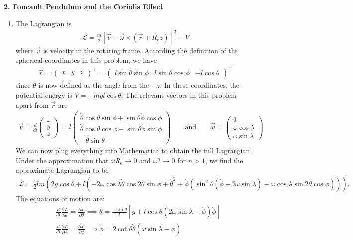 \documentclass{article}
\theoremstyle{definition}
\newcommand{\p}{\partial}
\newcommand{\lag}{\mathcal{L}}
\newcommand{\f}[2]{\frac{#1}{#2}}
\newcommand{\lp}{\left(}
\newcommand{\rp}{\right)}
\newcommand{\lb}{\left[}
\newcommand{\rb}{\right]}
\begin{document}
\noindent \textbf{2. Foucault Pendulum and the Coriolis Effect}

\begin{enumerate}[label=(\alph*)]
	\item The Lagrangian is 
	\begin{align*}
	\lag = \f{m}{2}\lb \vec{v} - \vec{\omega} \times (\vec{r} + R_e \hat{z})  \rb^2 -V
	\end{align*}
	where $\vec{v}$ is velocity in the rotating frame. According the definition of the spherical coordinates in this problem, we have
	\begin{align*}
	\vec{r} = \begin{pmatrix}
	x & y & z
	\end{pmatrix}^\top
	= 
	\begin{pmatrix}
	l\sin\theta\sin\phi & 
	l\sin\theta\cos\phi &
	-l\cos\theta
	\end{pmatrix}^\top
	\end{align*}
	since $\theta$ is now defined as the angle from the $-\hat{z}$. In these coordinates, the potential energy is $V = -mgl\cos\theta$. The relevant vectors in this problem apart from $\vec{r}$ are
	\begin{align*}
	\vec{v} = \f{d}{dt}\begin{pmatrix}
	x\\y\\z
	\end{pmatrix} = 
	l\begin{pmatrix}
	\dot\theta \cos \theta \sin\phi+\sin\theta\dot\phi\cos\phi \\
	\dot\theta \cos\theta \cos\phi-\sin
	\theta \dot\phi \sin\phi\\
	-\dot\theta \sin \theta
	\end{pmatrix}
	\quad \quad \text{and} \quad\quad
	\vec{\omega} = \begin{pmatrix}
	0 \\ \omega \cos\lambda \\ \omega\sin\lambda
	\end{pmatrix}
	\end{align*}
	We can now plug everything into Mathematica to obtain the full Lagrangian. Under the approximation that $\omega R_e \to 0$ and $\omega^n \to 0$ for $n > 1$, we find the approximate Lagrangian to be
	\begin{align*}
	\lag = \frac{1}{2} l m \left(2 g \cos\theta+l \left(-2 \omega  \cos\lambda  \dot\theta
	\cos 2 \theta \sin \phi +\dot\theta^2+\dot\phi \left(\sin^2\theta\left(\dot\phi-2 \omega  \sin \lambda \right)-\omega  \cos \lambda  \sin 2\theta  \cos \phi\right)\right)\right).
	\end{align*}
	The equations of motion are:
	\begin{align*}
	&\f{d}{dt} \f{\p \lag}{\p \dot{\theta}} = \f{\p \lag}{\p \theta} \implies 
	\boxed{\ddot\theta = \f{-\sin\theta }{l}\lb g+ l\cos\theta(2\omega\sin\lambda - \dot\phi)\dot\phi  \rb}\\
	&\f{d}{dt} \f{\p \lag}{\p \dot\phi} = \f{\p \lag}{\p \phi} \implies \boxed{\ddot\phi = 2\cot\theta \dot\theta \lp \omega\sin\lambda - \dot\phi \rp }
	\end{align*}
	

\end{enumerate}
\end{document}
